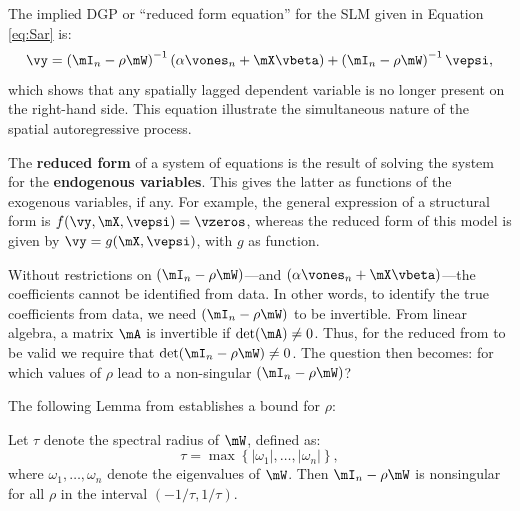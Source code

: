 \documentclass[english,12pt]{book}\usepackage[]{graphicx}\usepackage[]{xcolor}
\begin{document}
The implied DGP or ``reduced form equation'' for the SLM given in Equation \eqref{eq:Sar} is:
\begin{equation}\label{eq:Sar_dgp}
\vy  =  \left(\mI_n - \rho \mW\right)^{-1}\left(\alpha \vones_n + \mX\vbeta\right) + \left(\mI_n - \rho \mW\right)^{-1}\vepsi,
\end{equation}
%
which shows that any spatially lagged dependent variable is no longer present on the right-hand side. This equation illustrate the simultaneous nature of the spatial autoregressive process.

\begin{remark}
The \textbf{reduced form} of a system of equations is the result of solving the system for the \textbf{endogenous variables}. This gives the latter as functions of the exogenous variables, if any. For example, the general expression of a structural form is $f(\vy, \mX, \vepsi) = \vzeros$, whereas the reduced form of this model is given by $\vy = g(\mX, \vepsi)$, with $g$ as function. 
\end{remark}

Without restrictions on $(\mI_n-\rho\mW)$---and $\left(\alpha \vones_n + \mX\vbeta\right)$---the coefficients cannot be identified from data. In other words, to identify the true coefficients from data, we need $(\mI_n-\rho\mW)$ to be invertible. From linear algebra, a matrix $\mA$ is invertible if $\det(\mA)\neq 0$. Thus, for the reduced from to be valid we require that $\det(\mI_n -\rho\mW)\neq 0$. The question then becomes: for which values of $\rho$ lead to a non-singular $(\mI_n -\rho\mW)$? 


The following Lemma from \cite{kelejian2010specification} establishes a bound for $\rho$:

\begin{lemma}\label{lemma:bound-rho-kp}
Let $\tau$ denote the spectral radius of $\mW$, defined as:
\begin{equation*}
\tau = \max\left\lbrace |\omega_1|, \ldots, |\omega_n| \right\rbrace,
\end{equation*}
%
where $\omega_1, \ldots, \omega_n$ denote the eigenvalues of $\mW$. Then $\mI_n - \rho\mW$ is nonsingular for all $\rho$ in the interval $(-1/\tau, 1/\tau)$. 
\end{lemma}
\end{document}
